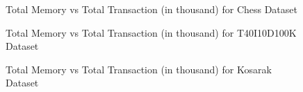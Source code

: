             \begin{figure}[h]
            \centering
                
            \caption{Total Memory vs Total Transaction (in thousand) for Chess Dataset }
            \label{result:g_chess_memory_node}
            \end{figure}
            
            \begin{figure}[h]
                
            \caption{Total Memory vs Total Transaction (in thousand) for T40I10D100K Dataset }
            \label{result:g_t10_memory_node}
            \end{figure}
        
            \begin{figure}[h]
            \centering
                
            \caption{Total Memory vs Total Transaction (in thousand) for Kosarak Dataset }
            \label{result:g_k_memory_node}
            \end{figure}